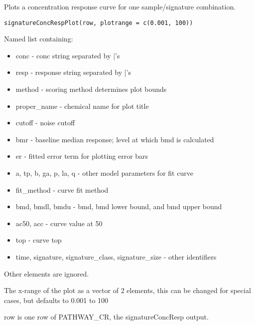 \documentclass[letterpaper]{book}
\begin{document}
%
\begin{Description}\relax
Plots a concentration response curve for one sample/signature combination.
\end{Description}
%
\begin{Usage}
\begin{verbatim}
signatureConcRespPlot(row, plotrange = c(0.001, 100))
\end{verbatim}
\end{Usage}
%
\begin{Arguments}
\begin{ldescription}
\item[\code{row}] Named list containing:
\begin{itemize}

\item conc - conc string separated by |'s
\item resp - response string separated by |'s
\item method - scoring method determines plot bounds
\item proper\_name - chemical name for plot title
\item cutoff - noise cutoff
\item bmr - baseline median response; level at which bmd is calculated
\item er - fitted error term for plotting error bars
\item a, tp, b, ga, p, la, q - other model parameters for fit curve
\item fit\_method - curve fit method
\item bmd, bmdl, bmdu - bmd, bmd lower bound, and bmd upper bound
\item ac50, acc - curve value at 50
\item top - curve top
\item time, signature, signature\_class, signature\_size - other identifiers

\end{itemize}

Other elements are ignored.

\item[\code{plotrange}] The x-range of the plot as a vector of 2 elements, this can be changed for special cases, but defaults to 0.001 to 100
\end{ldescription}
\end{Arguments}
%
\begin{Details}\relax
row is one row of PATHWAY\_CR, the signatureConcResp output.
\end{Details}
\end{document}
